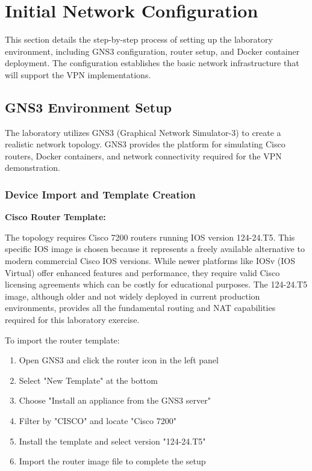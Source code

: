 \newpage

\section{Initial Network Configuration}

This section details the step-by-step process of setting up the laboratory environment, including GNS3 configuration, router setup, and Docker container deployment. The configuration establishes the basic network infrastructure that will support the VPN implementations.

\subsection{GNS3 Environment Setup}

The laboratory utilizes GNS3 (Graphical Network Simulator-3) to create a realistic network topology. GNS3 provides the platform for simulating Cisco routers, Docker containers, and network connectivity required for the VPN demonstration.

\subsubsection{Device Import and Template Creation}

\textbf{Cisco Router Template:}

\noindent
The topology requires Cisco 7200 routers running IOS version 124-24.T5. This specific IOS image is chosen because it represents a freely available alternative to modern commercial Cisco IOS versions. While newer platforms like IOSv (IOS Virtual) offer enhanced features and performance, they require valid Cisco licensing agreements which can be costly for educational purposes. The 124-24.T5 image, although older and not widely deployed in current production environments, provides all the fundamental routing and NAT capabilities required for this laboratory exercise.

\noindent
To import the router template:

\begin{enumerate}
    \item Open GNS3 and click the router icon in the left panel
    \item Select "New Template" at the bottom
    \item Choose "Install an appliance from the GNS3 server"
    \item Filter by "CISCO" and locate "Cisco 7200"
    \item Install the template and select version "124-24.T5"
    \item Import the router image file to complete the setup
\end{enumerate}

